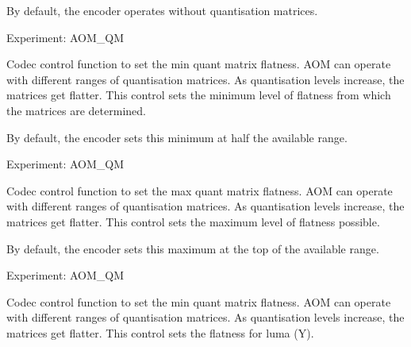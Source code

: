\begin{Desc}
\begin{description}
By default, the encoder operates without quantisation matrices.

Experiment\+: A\+O\+M\+\_\+\+QM \item[{\em 
A\+V1\+E\+\_\+\+S\+E\+T\+\_\+\+Q\+M\+\_\+\+M\+IN\hypertarget{group__aom__encoder_ggae78dde67a6d78f332e9bdba0dde42db5ae611944ba148b6446d4387dd9b452917}{}\label{group__aom__encoder_ggae78dde67a6d78f332e9bdba0dde42db5ae611944ba148b6446d4387dd9b452917}
}]Codec control function to set the min quant matrix flatness. A\+OM can operate with different ranges of quantisation matrices. As quantisation levels increase, the matrices get flatter. This control sets the minimum level of flatness from which the matrices are determined.

By default, the encoder sets this minimum at half the available range.

Experiment\+: A\+O\+M\+\_\+\+QM \item[{\em 
A\+V1\+E\+\_\+\+S\+E\+T\+\_\+\+Q\+M\+\_\+\+M\+AX\hypertarget{group__aom__encoder_ggae78dde67a6d78f332e9bdba0dde42db5ad897674e1b68b24ec14a01a4e3edacc7}{}\label{group__aom__encoder_ggae78dde67a6d78f332e9bdba0dde42db5ad897674e1b68b24ec14a01a4e3edacc7}
}]Codec control function to set the max quant matrix flatness. A\+OM can operate with different ranges of quantisation matrices. As quantisation levels increase, the matrices get flatter. This control sets the maximum level of flatness possible.

By default, the encoder sets this maximum at the top of the available range.

Experiment\+: A\+O\+M\+\_\+\+QM \item[{\em 
A\+V1\+E\+\_\+\+S\+E\+T\+\_\+\+Q\+M\+\_\+Y\hypertarget{group__aom__encoder_ggae78dde67a6d78f332e9bdba0dde42db5a49c0eb54ab5a4d7d6cbc97d97f3029f8}{}\label{group__aom__encoder_ggae78dde67a6d78f332e9bdba0dde42db5a49c0eb54ab5a4d7d6cbc97d97f3029f8}
}]Codec control function to set the min quant matrix flatness. A\+OM can operate with different ranges of quantisation matrices. As quantisation levels increase, the matrices get flatter. This control sets the flatness for luma (Y).


\end{description}
\end{Desc}
